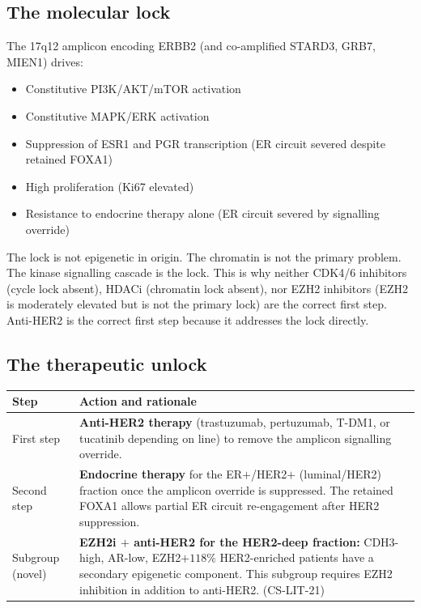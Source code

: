 \documentclass[12pt, a4paper]{article}
\begin{document}
\subsection{The molecular lock}

The 17q12 amplicon encoding ERBB2 (and co-amplified
STARD3, GRB7, MIEN1) drives:
\begin{itemize}[noitemsep]
  \item Constitutive PI3K/AKT/mTOR activation
  \item Constitutive MAPK/ERK activation
  \item Suppression of ESR1 and PGR transcription
        (ER circuit severed despite retained FOXA1)
  \item High proliferation (Ki67 elevated)
  \item Resistance to endocrine therapy alone
        (ER circuit severed by signalling override)
\end{itemize}

The lock is not epigenetic in origin. The chromatin
is not the primary problem. The kinase signalling
cascade is the lock. This is why neither CDK4/6
inhibitors (cycle lock absent), HDACi (chromatin
lock absent), nor EZH2 inhibitors (EZH2 is moderately
elevated but is not the primary lock) are the correct
first step. Anti-HER2 is the correct first step
because it addresses the lock directly.

\subsection{The therapeutic unlock}

\begin{center}
\begin{tabular}{p{3.5cm}p{9cm}}
\toprule
\textbf{Step} & \textbf{Action and rationale} \\
\midrule
First step
& \textbf{Anti-HER2 therapy} (trastuzumab,
  pertuzumab, T-DM1, or tucatinib depending on line)
  to remove the amplicon signalling override. \\[0.3em]
Second step
& \textbf{Endocrine therapy} for the ER$+$/HER2$+$
  (luminal/HER2) fraction once the amplicon override
  is suppressed. The retained FOXA1 allows partial
  ER circuit re-engagement after HER2 suppression. \\[0.3em]
Subgroup (novel)
& \textbf{EZH2i $+$ anti-HER2 for the HER2-deep
  fraction:} CDH3-high, AR-low, EZH2$+118\%$
  HER2-enriched patients have a secondary epigenetic
  component. This subgroup requires EZH2 inhibition
  in addition to anti-HER2. (CS-LIT-21) \\
\bottomrule
\end{tabular}
\end{center}
\end{document}
